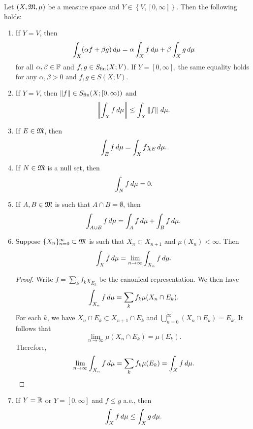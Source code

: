 \documentclass[a4paper]{article}
\renewcommand{\cupinfn}{\bigcup_{n=0}^\infty}
\renewcommand{\seqinfn}[1]{\{ #1 \}_{n=0}^\infty}
\begin{document}
\begin{prop}
  Let $(X, \mathfrak{M}, \mu)$ be a measure space and
  $Y \in \left\{ V, [0, \infty] \right\}$.
  Then the following holds:
  \begin{enumerate}
    \item If $Y = V$, then
    \[
      \int_X (\alpha f + \beta g) \, d \mu
      = \alpha \int_X f \, d \mu + \beta \int_X
      g \, d \mu
    \]
    for all $\alpha, \beta \in \mathbb{F}$ and
    $f, g \in S_{\text{fin}}(X ; V)$.
    If $Y = [0, \infty]$, the same equality holds
    for any $\alpha, \beta > 0$ and $f, g \in S(X; V)$.

    \item If $Y = V$, then
    $\left\lVert f\right\rVert \in S_{\text{fin}}(X; [0, \infty))$
    and
    \[
      \left\lVert \int_X f \, d\mu\right\rVert \leq \int_X \left\lVert f\right\rVert \, d\mu.
    \]

    \item If $E \in \mathfrak{M}$, then
    \[
      \int_E f \, d \mu = \int_X f \chi_E \, d \mu.
    \]

    \item If $N \in \mathfrak{M}$ is a null set, then
    \[
      \int_N f \, d \mu = 0.
    \]

    \item If $A, B \in \mathfrak{M}$ is such that
    $A \cap B = \emptyset$,
    then
    \[
    \int_{A \cup B} f \, d\mu = \int_A f \, d\mu
    + \int_B f \, d\mu.
    \]

    \item Suppose $\seqinfn{X_n} \subset \mf$ is such that
    $X_n \subset X_{n+1}$ and $\mu(X_n) < \infty$.
    Then
    \[
      \int_X f \, d \mu = \lim_{n \to \infty}
      \int_{X_n} f \, d\mu.
    \]

    \begin{proof}
      Write $f = \sum_k f_k \chi_{E_k}$ be the canonical
      representation. We then have
      \[
      \int_{X_n} f \, d\mu = \sum_k f_k \mu(X_n \cap E_k).
      \]
      For each $k$, we have
      $X_n \cap E_k \subset X_{n+1} \cap E_k$ and
      $\cupinfn (X_n \cap E_k) = E_k$.
      It follows that
      \[
        \lim_{n \to \infty} \mu(X_n \cap E_k)
        = \mu(E_k).
      \]
      Therefore,
      \[
      \lim_{n \to \infty} \int_{X_n} f \, d\mu
      = \sum_k f_k \mu(E_k) = \int_X f \, d\mu.
      \]

    \end{proof}

    \item If $Y = \mathbb{R}$ or $Y = [0, \infty]$ and
    $f \leq g$ a.e., then
    \[
    \int_X f \, d\mu \leq \int_X g \, d\mu.
    \]
  \end{enumerate}
\end{prop}
\end{document}

